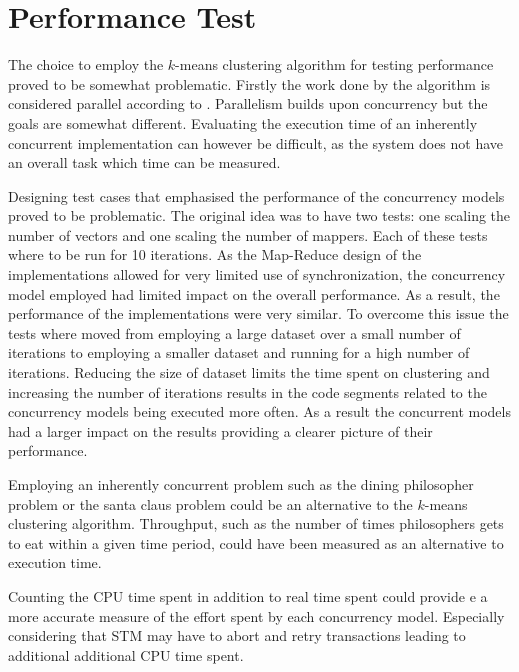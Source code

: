 \section{Performance Test}\label{sec:reflec_perf_test}
The choice to employ the $k$-means clustering algorithm for testing performance proved to be somewhat problematic. Firstly the work done by the algorithm is considered parallel according to . Parallelism builds upon concurrency but the goals are somewhat different. Evaluating the execution time of an inherently concurrent implementation can however be difficult, as the system does not have an overall task which time can be measured.

Designing test cases that emphasised the performance of the concurrency models proved to be problematic. The original idea was to have two tests: one scaling the number of vectors and one scaling the number of mappers. Each of these tests where to be run for 10 iterations. As the Map-Reduce design of the implementations allowed for very limited use of synchronization, the concurrency model employed had limited impact on the overall performance. As a result, the performance of the implementations were very similar. To overcome this issue the tests where moved from employing a large dataset over a small number of iterations to employing a smaller dataset and running for a high number of iterations. Reducing the size of dataset limits the time spent on clustering and increasing the number of iterations results in the code segments related to the concurrency models being executed more often. As a result the concurrent models had a larger impact on the results providing a clearer picture of their performance.

Employing an inherently concurrent problem such as the dining philosopher problem\cite[p. 673]{hoare1978communicating} or the santa claus problem\cite{trono1994new} could be an alternative to the $k$-means clustering algorithm. Throughput, such as the number of times philosophers gets to eat within a given time period, could have been measured as an alternative to execution time.

Counting the CPU time spent in addition to real time spent could provide e a more accurate measure of the effort spent by each concurrency model. Especially considering that \ac{STM} may have to abort and retry transactions leading to additional additional CPU time spent.

